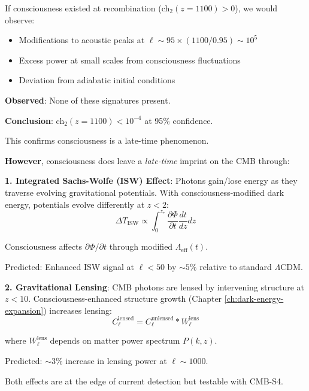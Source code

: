 \begin{proposition}\label{prop:no-early-consciousness-cmb}
If consciousness existed at recombination (ch$_2(z=1100) > 0$), we would observe:
\begin{itemize}
\item Modifications to acoustic peaks at $\ell \sim 95 \times (1100/0.95) \sim 10^5$
\item Excess power at small scales from consciousness fluctuations
\item Deviation from adiabatic initial conditions
\end{itemize}

\textbf{Observed}: None of these signatures present\cite{planck2018}.

\textbf{Conclusion}: ch$_2(z = 1100) < 10^{-4}$ at 95\% confidence.

This confirms consciousness is a late-time phenomenon.
\end{proposition}

\begin{level3}
\textbf{However}, consciousness does leave a \textit{late-time} imprint on the CMB through:

\textbf{1. Integrated Sachs-Wolfe (ISW) Effect}\cite{sachs1967}: Photons gain/lose energy as they traverse evolving gravitational potentials. With consciousness-modified dark energy, potentials evolve differently at $z < 2$:
\begin{equation}
\Delta T_{\text{ISW}} \propto \int_0^{z_*} \frac{\partial \Phi}{\partial t} \frac{dt}{dz} dz
\end{equation}

Consciousness affects $\partial \Phi / \partial t$ through modified $\Lambda_{\text{eff}}(t)$.

Predicted: Enhanced ISW signal at $\ell < 50$ by $\sim 5\%$ relative to standard $\Lambda$CDM.

\textbf{2. Gravitational Lensing}\cite{lewis2000}: CMB photons are lensed by intervening structure at $z < 10$. Consciousness-enhanced structure growth (Chapter \ref{ch:dark-energy-expansion}) increases lensing:
\begin{equation}
C_\ell^{\text{lensed}} = C_\ell^{\text{unlensed}} * W_\ell^{\text{lens}}
\end{equation}

where $W_\ell^{\text{lens}}$ depends on matter power spectrum $P(k, z)$.

Predicted: $\sim 3\%$ increase in lensing power at $\ell \sim 1000$.

Both effects are at the edge of current detection but testable with CMB-S4\cite{cmbs42019}.
\end{level3}

